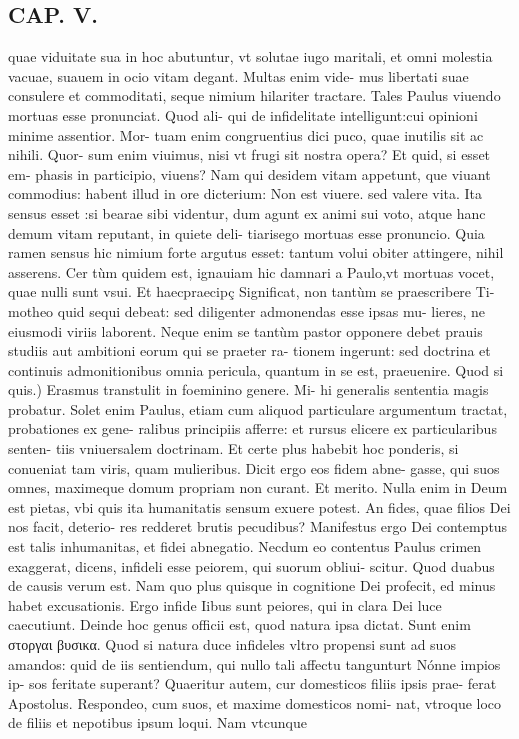 \documentclass{article}
\begin{document}
\begin{pages}
\section*{CAP. V. }
\marginpar{[ p.59 ]}\pstart quae viduitate sua in hoc abutuntur, vt solutae iugo maritali, et omni molestia vacuae, suauem in ocio vitam degant. Multas enim vide- mus libertati suae consulere et commoditati, seque nimium hilariter tractare. Tales Paulus viuendo mortuas esse pronunciat. Quod ali- qui de infidelitate intelligunt:cui opinioni minime assentior. Mor- tuam enim congruentius dici puco, quae inutilis sit ac nihili. Quor- sum enim viuimus, nisi vt frugi sit nostra opera? Et quid, si esset em- phasis in participio, viuens? Nam qui desidem vitam appetunt, que viuant commodius: habent illud in ore dicterium: Non est viuere. sed valere vita. Ita sensus esset :si bearae sibi videntur, dum agunt ex animi sui voto, atque hanc demum vitam reputant, in quiete deli- tiarisego mortuas esse pronuncio. Quia ramen sensus hic nimium forte argutus esset: tantum volui obiter attingere, nihil asserens. Cer tùm quidem est, ignauiam hic damnari a Paulo,vt mortuas vocet, quae nulli sunt vsui.  \pend\pstart Et haecpraecipç Significat, non tantùm se praescribere Ti- motheo quid sequi debeat: sed diligenter admonendas esse ipsas mu- lieres, ne eiusmodi viriis laborent. Neque enim se tantùm pastor opponere debet prauis studiis aut ambitioni eorum qui se praeter ra- tionem ingerunt: sed doctrina et continuis admonitionibus omnia pericula, quantum in se est, praeuenire.  \pend\pstart Quod si quis.) Erasmus transtulit in foeminino genere. Mi- hi generalis sententia magis probatur. Solet enim Paulus, etiam cum aliquod particulare argumentum tractat, probationes ex gene- ralibus principiis afferre: et rursus elicere ex particularibus senten- tiis vniuersalem doctrinam. Et certe plus habebit hoc ponderis, si conueniat tam viris, quam mulieribus. Dicit ergo eos fidem abne- gasse, qui suos omnes, maximeque domum propriam non curant. Et merito. Nulla enim in Deum est pietas, vbi quis ita humanitatis sensum exuere potest. An fides, quae filios Dei nos facit, deterio- res redderet brutis pecudibus? Manifestus ergo Dei contemptus est talis inhumanitas, et fidei abnegatio. Necdum eo contentus Paulus crimen exaggerat, dicens, infideli esse peiorem, qui suorum obliui- scitur. Quod duabus de causis verum est. Nam quo plus quisque in cognitione Dei profecit, ed minus habet excusationis. Ergo infide Iibus sunt peiores, qui in clara Dei luce caecutiunt. Deinde hoc genus officii est, quod natura ipsa dictat. Sunt enim στοργαι βυσικα. Quod si natura duce infideles vltro propensi sunt ad suos amandos: quid de iis sentiendum, qui nullo tali affectu tangunturt Nónne impios ip- sos feritate superant? Quaeritur autem, cur domesticos filiis ipsis prae- ferat Apostolus. Respondeo, cum suos, et maxime domesticos nomi- nat, vtroque loco de filiis et nepotibus ipsum loqui. Nam vtcunque  \pend

\end{pages}
\end{document}
